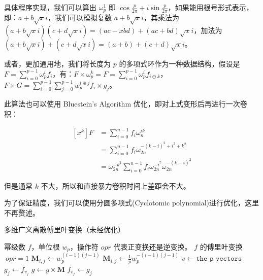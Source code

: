 \documentclass[12pt]{article} %
\begin{document}
具体程序实现，我们可以算出 $\omega_p^1$ 即 $\cos \frac{p}{2\pi} + i\sin \frac{p}{2\pi}$，如果能用根号形式表示，即：$a+b\sqrt{x}i$，我们可以模拟复数 $a+b\sqrt{x}i$，其乘法为 $(a+b\sqrt{x}i)(c+d\sqrt{x}i)=(ac-xbd)+(ac+bd)\sqrt{x}i$，加法为 $(a+b\sqrt xi)+(c+d\sqrt xi)=(a+b)+(c+d)\sqrt xi$。

或者，更加通用地，我们将长度为 $p$ 的多项式环作为一种数据结构，假设是 $F=\sum_{i=0}^{p-1} \omega_p^i f_i$，有：$F \times \omega_p^k=F=\sum_{i=0}^{p-1} \omega_p^i f_{i\ominus k}$，$F \times G=\sum_{i=0}^{p-1} \sum_{j=0}^{p-1} w_p^{i \oplus j} f_i \times g_j$。

此算法也可以使用 Bluestein's Algorithm 优化，即对上式变形后再进行一次卷积：

$$
\begin{aligned}
	[x^k]F & = \sum_{i=0}^{n-1}f_i\omega_n^{ik} \\
	& = \sum_{i=0}^{n-1}f_i\omega_{2n}^{-{(k-i)^2+i^2+k^2}} \\
	& = \omega_{2n}^{-{k^2}}\sum_{i=0}^{n-1}f_i\omega_{2n}^{-{i^2}}\omega_{2n}^{-{(k-i)^2}}
\end{aligned}
$$

但是通常 $k$ 不大，所以和直接暴力卷积时间上差距会不大。

为了保证精度，我们可以使用分圆多项式(Cyclotomic polynomial)进行优化，这里不再赘述。

\newpage

\begin{algorithm}
    \caption{多维广义离散傅里叶变换（未经优化）}
    \begin{algorithmic}[1]
        \Require 幂级数 $f$，单位根 $w_p$，操作符 $opr$ 代表正变换还是逆变换。
        \Ensure $f$ 的傅里叶变换
            \If $\ opr=1$
                \State $\textbf{M}_{i,j} \gets w^{(i-1)(j-1)}_p$
            \Else
                \State $\textbf{M}_{i,j} \gets \frac{1}{p}w^{-(i-1)(j-1)}_p$
            \EndIf
                    \State $v \gets \texttt{the p vectors}$
                        \State $g_j \gets f_{v_j}$
                    \EndFor
                    \State $g \gets g \times \textbf{M}$
                        \State $f_{v_j} \gets g_j$
                    \EndFor
                \EndFor
            \EndFor
            \State {}
        \EndFunction
    \end{algorithmic}
\end{algorithm}
\end{document}

